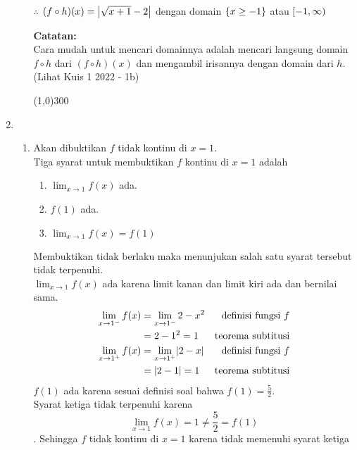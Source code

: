 \begin{enumerate}[leftmargin=*, label={\arabic*}.]
\begin{enumerate}[label={\alph*}.]
$\therefore$ $(f \circ h)(x) = \abs*{\sqrt{x+1} - 2}$ dengan domain 
$\set*{x \geq -1}$ atau $\cio{-1,\infty}$ 
    
\vspace{0.1cm}
\textbf{Catatan:}\\
Cara mudah untuk mencari domainnya adalah mencari langsung domain 
$f \circ h$ dari $(f \circ h)(x)$ dan mengambil irisannya dengan 
domain dari $h$. (Lihat Kuis 1 2022 - 1b)
\begin{center}
    \line(1,0){300}
\end{center}
\end{enumerate}
\item
\begin{enumerate}[label={\alph*}.]
\item Akan dibuktikan $f$ tidak kontinu di $x=1$.\\
Tiga syarat untuk membuktikan $f$ kontinu di $x=1$ adalah
\begin{enumerate}[label={\arabic*}.]
    \item $\lim_{x\to 1} f(x)$ ada.
    \item $f(1)$ ada.
    \item $\lim_{x\to 1} f(x) = f(1)$
\end{enumerate}
Membuktikan tidak berlaku maka menunjukan salah satu syarat tersebut tidak
terpenuhi.\\
$\lim_{x\to 1} f(x)$ ada karena limit kanan dan limit kiri ada dan bernilai sama.
\begin{align*}
    \lim_{x\to 1^{-}} f(x) 
    &= \lim_{x\to 1^{-}} 2-x^{2}
    &\text{definisi fungsi $f$}\\
    &= 2-1^{2} = 1
    &\text{teorema subtitusi}\\
    \lim_{x\to 1^{+}} f(x) 
    &= \lim_{x\to 1^{+}} \abs{2-x}
    &\text{definisi fungsi $f$}\\
    &= \abs{2-1} = 1
    &\text{teorema subtitusi}
\end{align*}
$f(1)$ ada karena sesuai definisi soal bahwa $f(1) = \frac{5}{2}$.\\
Syarat ketiga tidak terpenuhi karena
\[
    \lim_{x\to 1} f(x) = 1 \neq \frac{5}{2} = f(1)
\].
Sehingga $f$ tidak kontinu di $x=1$ karena tidak memenuhi syarat ketiga


\end{enumerate}
\end{enumerate}
